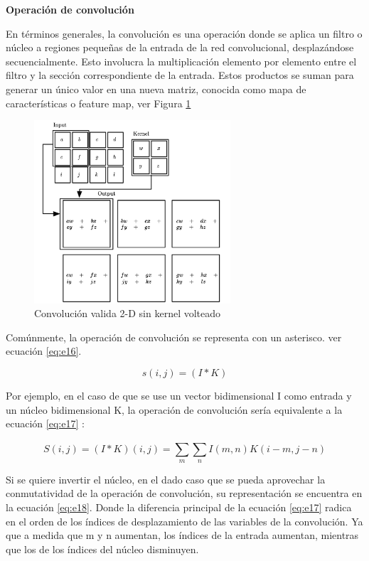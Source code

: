 \textbf{Operación de convolución}

En términos generales, la convolución es una operación donde se  aplica un filtro o núcleo a regiones pequeñas de la entrada de la red convolucional, desplazándose secuencialmente. Esto involucra la multiplicación elemento por elemento entre el filtro y la sección correspondiente de la entrada. Estos productos se suman para generar un único valor en una nueva matriz, conocida como mapa de características o feature map, ver Figura \ref{fig:an10}

\begin{figure}[h!]
	\includegraphics[width=0.65\textwidth]{capitulo2/figuras/an10.png}
	\caption{Convolución valida 2-D sin kernel volteado}
	\label{fig:an10}
\end{figure}

Comúnmente, la operación de convolución se representa con un asterisco. ver ecuación \ref{eq:e16}.

\begin{equation} \label{eq:e16} 
	s(i,j)=(I\ast K)
\end{equation}

Por ejemplo, en el caso de que se use un vector bidimensional I como entrada y un núcleo bidimensional K, la operación de convolución sería equivalente a la ecuación \ref{eq:e17} :

\begin{equation} \label{eq:e17} 
	S(i,j)=(I\ast K)(i,j)=\sum_{m}^{}\sum_{n}^{}I(m,n)K(i-m,j-n)
\end{equation}

Si se quiere invertir el núcleo, en el dado caso que se pueda aprovechar la conmutatividad de la operación de convolución, su representación se encuentra en la ecuación \ref{eq:e18}. Donde la  diferencia principal de la ecuación \ref{eq:e17} radica en el orden de los índices de desplazamiento de las variables de la convolución. Ya que a medida que m y n aumentan, los índices de la entrada aumentan, mientras que los de los índices del núcleo disminuyen.


